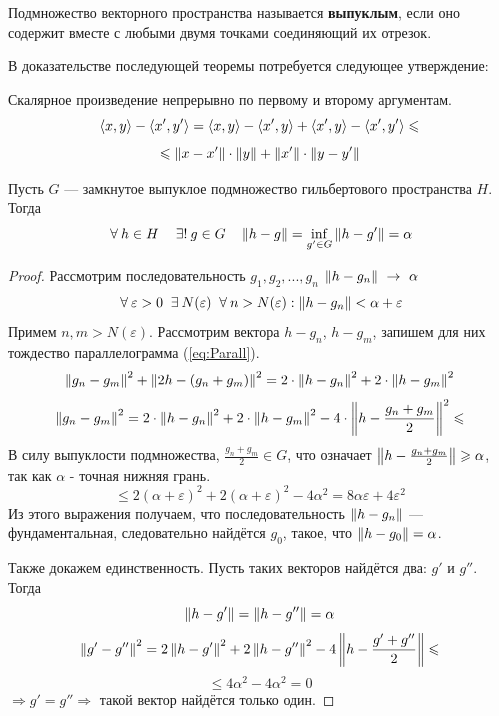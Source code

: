 \documentclass[12pt]{article}
\begin{document}

			\begin{defi}
				Подмножество векторного пространства называется \textbf{выпуклым}, если оно содержит вместе с любыми двумя
				точками соединяющий их отрезок.
			\end{defi}

			В доказательстве последующей теоремы потребуется следующее утверждение:
			\begin{state}
				Скалярное произведение непрерывно по первому и второму аргументам.
				$$\left\langle x, y \right\rangle - \left\langle x', y' \right\rangle = \left\langle x, y \right\rangle - \left\langle x', y \right\rangle + \left\langle x', y \right\rangle - \left\langle x', y' \right\rangle \leqslant$$
				$$\leqslant \left\| x - x' \right\|\cdot \left\| y \right\| + \left\| x' \right\| \cdot \left\| y - y' \right\|$$
			\end{state}

			\begin{theorem}
				Пусть $G$ --- замкнутое выпуклое подмножество гильбертового пространства $H$. Тогда
				$$\forall h \in H \quad \existsonly g \in G \quad \norm{h-g} = \underset{g' \in G}{\inf} \norm{h-g'} = \alpha$$
			\end{theorem}
			\begin{proof}
				Рассмотрим последовательность $g_1, g_2, ..., g_n$ $\left\| h - g_n \right\|~\rightarrow~\alpha$
				$$\forall \varepsilon > 0 ~ \exists N(\varepsilon) ~ \forall n > N(\varepsilon): \norm{h - g_n} < \alpha + \varepsilon$$
				Примем $n, m > N(\varepsilon)$. Рассмотрим вектора $h - g_n$, $h - g_m$, запишем для них тождество параллелограмма 
				(\ref{eq:Parall}).
				$$\left\| g_n - g_m \right\|^2 + \left\| 2h - (g_n + g_m) \right\|^2 = 2 \cdot \left\| h - g_n \right\|^2 + 2 \cdot \left\| h - g_m \right\|^2$$
				$$\left\| g_n - g_m \right\|^2 = 2 \cdot \left\| h - g_n \right\|^2 + 2 \cdot \left\| h - g_m \right\|^2 - 4 \cdot \left\| h - \frac{g_n + g_m}{2} \right\|^2 \leqslant$$
				В силу выпуклости подмножества, $\frac{g_n + g_m}{2} \in G$, что означает $\left\| h - \frac{g_n + g_m}{2} \right\| \geqslant \alpha$, так
				как $\alpha$ - точная нижняя грань.
				$$\leq 2 (\alpha + \varepsilon)^2 + 2 (\alpha + \varepsilon)^2 - 4 \alpha^2 = 8 \alpha \varepsilon + 4 \varepsilon^2$$
				Из этого выражения получаем, что последовательность $\left\| h - g_n \right\|$ --- фундаментальная, следовательно найдётся $g_0$, 
				такое, что $\left\| h - g_0 \right\| = \alpha$.
		
				Также докажем единственность. Пусть таких векторов найдётся два: $g'$ и $g''$. Тогда
				$$\left\| h - g' \right\| = \left\| h - g'' \right\| = \alpha$$
				$$\left\| g' - g'' \right\|^2 = 2 \left\| h - g' \right\|^2 + 2 \left\| h - g'' \right\|^2 - 4 \left\| h - \frac{g' + g''}{2} \right\| \leqslant$$
				$$\leq 4 \alpha^2 - 4 \alpha^2 = 0$$
				$\Rightarrow g' = g'' \Rightarrow$ такой вектор найдётся только один.
			\end{proof}
\end{document}
